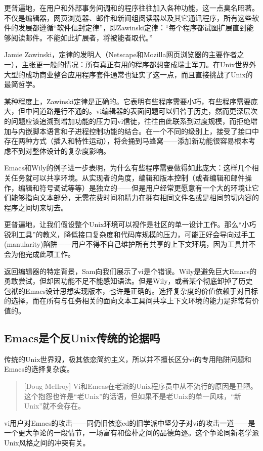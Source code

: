 \documentclass[12pt,oneside]{book}
\begin{document}
更普遍地，在用户和外部事务间调和的程序往往加入各种功能，这一点臭名昭著。不仅是编辑器，网页浏览器、邮件和新闻组阅读器以及其它通讯程序，所有这些软件的发展都遵循“软件信封定律”，即Zawinski定律：“每个程序都试图扩展直到能够阅读邮件。不能如此扩展者，将被能者取代。”

Jamie Zawinski，定律的发明人（Netscape和Mozilla网页浏览器的主要作者之一），主张更一般的情况：所有真正有用的程序都想变成瑞士军刀。在Unix世界外大型的成功商业整合应用程序套件通常也证实了这一点，而且直接挑战了Unix的最简哲学。

某种程度上，Zawinski定律是正确的。它表明有些程序需要小巧，有些程序需要庞大，但中间道路是行不通的。vi编辑器的表面问题可以归咎于历史，然而更深层次的问题应该追溯到增加功能的压力同vi信徒，往往由此联系到过度规模，而拒绝增加与内嵌脚本语言和子进程控制功能的结合。在一个不同的级别上，接受了接口中存在两种方式（插入和特性运动），将会捅到马蜂窝——添加新功能很容易根本考虑不到对整体设计的复杂度影响。

Emacs和Wily的例子进一步表明，为什么有些程序需要做得如此庞大：这样几个相关任务就可以共享环境。从实现者的角度，编辑和版本控制（或者编辑和邮件操作，编辑和符号调试等等）是独立的——但是用户经常更愿意有一个大的环境让它们能够指向文本部分，无需花费时间和精力在拥有相同文件名或是相同剪切内容的程序之间切来切去。

更普遍地，让我们假设整个Unix环境可以视作是社区的单一设计工作。那么“小巧锐利工具”的教义，降低接口复杂度和代码库规模的压力，可能正好会导向过手工(manularity)陷阱——用户不得不自己维护所有共享的上下文环境，因为工具并不会为他完成此项工作。

返回编辑器的特定背景，Sam向我们展示了vi是个错误。Wily是避免巨大Emacs的勇敢尝试，但却因功能不足不能感知语法。但是Wily，或者某个彻底卸掉了历史包袱的Emacs设计思想实现版本，也许是正确的。选择复杂度的价值依赖于对目标的选择，而在所有与任务相关的面向文本工具间共享上下文环境的能力是非常有价值的。

\subsection{Emacs是个反Unix传统的论据吗}
传统的Unix世界观，极其依恋简约主义，所以并不擅长区分vi的专用陷阱问题和Emacs的选择复杂度。

\begin{quote}[Doug McIlroy]
Vi和Emcas在老派的Unix程序员中从不流行的原因是丑陋。这个抱怨也许是“老Unix”的话语，但如果不是老Unix的单一风味，“新Unix”就不会存在。
\end{quote}

vi用户对Emacs的攻击——同仍旧依恋ed的旧学派中坚分子对vi的攻击一道——是一个更大争论的一段情节，一场富有和俭朴之间的品德角逐。这个争论同新老学派Unix风格之间的冲突有关。
\end{document}
